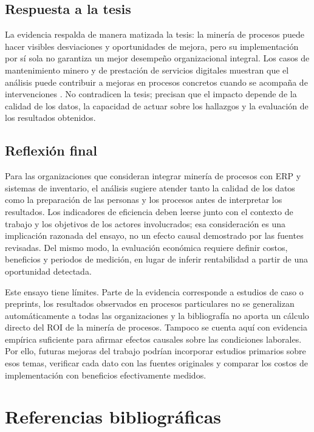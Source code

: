 \documentclass{article}
\begin{document}
    \subsection{Respuesta a la tesis}

    La evidencia respalda de manera matizada la tesis: la minería de procesos puede hacer visibles desviaciones y oportunidades de mejora, pero su implementación por sí sola no garantiza un mejor desempeño organizacional integral. Los casos de mantenimiento minero y de prestación de servicios digitales muestran que el análisis puede contribuir a mejoras en procesos concretos cuando se acompaña de intervenciones \cite{miningindustry2023,digitalservice2024}. No contradicen la tesis; precisan que el impacto depende de la calidad de los datos, la capacidad de actuar sobre los hallazgos y la evaluación de los resultados obtenidos.

    \subsection{Reflexión final}

    Para las organizaciones que consideran integrar minería de procesos con ERP y sistemas de inventario, el análisis sugiere atender tanto la calidad de los datos como la preparación de las personas y los procesos antes de interpretar los resultados. Los indicadores de eficiencia deben leerse junto con el contexto de trabajo y los objetivos de los actores involucrados; esa consideración es una implicación razonada del ensayo, no un efecto causal demostrado por las fuentes revisadas. Del mismo modo, la evaluación económica requiere definir costos, beneficios y periodos de medición, en lugar de inferir rentabilidad a partir de una oportunidad detectada.

    Este ensayo tiene límites. Parte de la evidencia corresponde a estudios de caso o preprints, los resultados observados en procesos particulares no se generalizan automáticamente a todas las organizaciones y la bibliografía no aporta un cálculo directo del ROI de la minería de procesos. Tampoco se cuenta aquí con evidencia empírica suficiente para afirmar efectos causales sobre las condiciones laborales. Por ello, futuras mejoras del trabajo podrían incorporar estudios primarios sobre esos temas, verificar cada dato con las fuentes originales y comparar los costos de implementación con beneficios efectivamente medidos.

    \section{Referencias bibliográficas}
    
    

    
\end{document}
